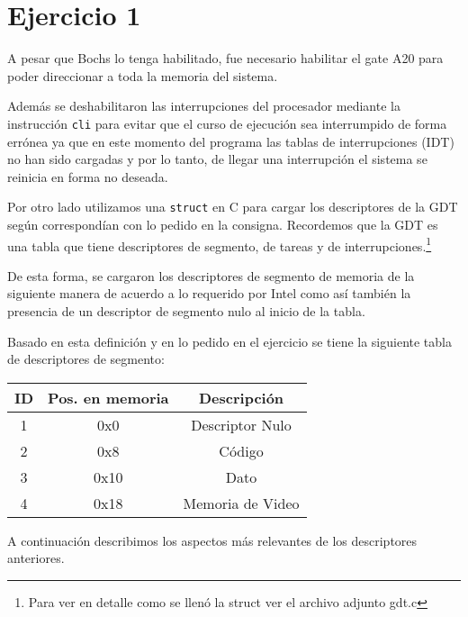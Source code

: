 
\section{Ejercicio 1}


A pesar que Bochs lo tenga habilitado, fue necesario habilitar el gate A20 para poder direccionar a toda la memoria del sistema.


Además se deshabilitaron las interrupciones del procesador mediante la instrucción \texttt{cli} para evitar que el curso de ejecución sea interrumpido de forma errónea ya que en este momento del programa las tablas de interrupciones (IDT) no han sido cargadas y por lo tanto, de llegar una interrupción el sistema se reinicia en forma no deseada.

Por otro lado utilizamos una \texttt{struct} en C para cargar los descriptores de la GDT según correspondían con lo pedido en la consigna. Recordemos que la GDT es una tabla que tiene descriptores de segmento, de tareas y de interrupciones.\footnote{Para ver en detalle como se llenó la struct ver el archivo adjunto gdt.c}

De esta forma, se cargaron los descriptores de segmento de memoria de la siguiente manera de acuerdo a lo requerido por Intel como así también la presencia de un descriptor de segmento nulo al inicio de la tabla.


Basado en esta definición y en lo pedido en el ejercicio se tiene la siguiente tabla de descriptores de segmento:

\begin{center}
\begin{tabular}{|c|c|c|}
\hline
ID & Pos. en memoria & Descripción\\
\hline
1 & 0x0 & Descriptor Nulo \\
2 & 0x8 & Código \\
3 & 0x10 & Dato \\
4 & 0x18 & Memoria de Video \\
\hline
\end{tabular}
\end{center}

A continuación describimos los aspectos más relevantes de los descriptores anteriores.

